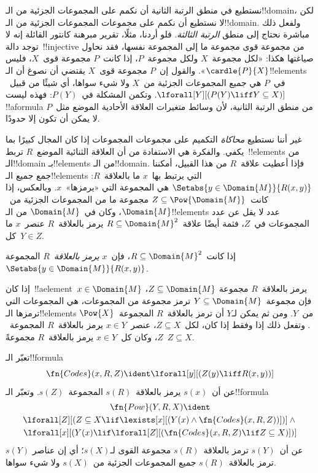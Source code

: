\documentclass[../../../include/open-logic-section]{subfiles}
\begin{document}


\begin{explain}
نستطيع في منطق الرتبة الثانية أن نكمم على المجموعات الجزئية من
الـ!!{domain}، لكن لا نستطيع أن نكمم على مجموعات المجموعات الجزئية من
الـ!!{domain}.
ولفعل ذلك مباشرة نحتاج إلى منطق \emph{الرتبة الثالثة}. فلو أردنا، مثلًا،
تقرير مبرهنة كانتور القائلة إنه لا توجد دالة~!!{injective} من مجموعة
قوى مجموعة ما إلى المجموعة نفسها، فقد نحاول صياغتها هكذا: «لكل
مجموعة~$X$ ولكل مجموعة~$P$، إذا كانت~$P$ مجموعة قوى~$X$، فليس
$\cardle{P}{X}$». والقول إن~$P$ مجموعة قوى~$X$ يقتضي أن نصوغ أن
الـ!!{element}s في~$P$ هي جميع المجموعات الجزئية من~$X$ ولا شيء
سواها، أي شيئًا من قبيل~$\lforall[Y][(P(Y)
  \liff Y \subseteq X)]$. وتكمن المشكلة في~$P(Y)$: فهذه ليست
!!a{formula} من منطق الرتبة الثانية، لأن وسائط متغيرات العلاقة الأحادية
الموضع مثل~$P$ لا يمكن أن تكون إلا حدودًا.

غير أننا نستطيع \emph{محاكاة} التكميم على مجموعات المجموعات إذا كان
المجال كبيرًا بما يكفي. والفكرة هي الاستفادة من أن العلاقة الثنائية
الموضع~$R$ تربط~!!{element}s من الـ!!{domain} بـ!!{element}s من
الـ!!{domain}. فإذا أعطيت علاقة~$R$ من هذا القبيل، أمكننا جمع جميع
الـ!!{element}s التي يرتبط بها~$x$ ما بالعلاقة~$R$:
$\Setabs{y \in \Domain{M}}{R(x,y)}$ هي المجموعة التي «يرمزها»~$x$.
وبالعكس، إذا كانت~$Z \subseteq \Pow{\Domain{M}}$ مجموعة ما من
المجموعات الجزئية من~$\Domain{M}$، وكان في~$\Domain{M}$ من
الـ!!{element}s عدد لا يقل عن عدد المجموعات في~$Z$، فثمة أيضًا
علاقة~$R \subseteq \Domain{M}^2$ يرمز بالعلاقة~$R$ عنصر~$x$ ما
كل~$Y \in Z$.
\end{explain}

\begin{defn}
إذا كانت~$R \subseteq \Domain{M}^2$، فإن~\emph{$x$ يرمز بالعلاقة~$R$}
المجموعة~$\Setabs{y \in \Domain{M}}{R(x, y)}$.
\end{defn}

إذا كان~!!a{element}~$x \in \Domain{M}$ يرمز بالعلاقة~$R$ مجموعة
$Z \subseteq \Domain{M}$، فإن مجموعة~$Y \subseteq \Domain{M}$ ترمز
مجموعة من المجموعات، هي المجموعات التي ترمزها الـ!!{element}s من~$Y$.
ومن ثم يمكن لـ$Y$ أن ترمز بالعلاقة~$R$ المجموعة~$\Pow{X}$. وتفعل ذلك
إذا وفقط إذا كان، لكل~$Z \subseteq X$، عنصر~$x \in Y$ يرمز
بالعلاقة~$R$ المجموعة~$Z$، وكان كل~$x \in Y$ يرمز بالعلاقة~$R$
مجموعةً~$Z \subseteq X$.

\begin{prop}
تعبّر الـ!!{formula}
  \[
  \fn{Codes}(x, R, Z) \ident \lforall[y][(Z(y) \liff
    R(x, y))]
  \]
عن أن~$s(x)$ يرمز بالعلاقة~$s(R)$ المجموعة~$s(Z)$. وتعبّر
الـ!!{formula}
\begin{multline*}
  \fn{Pow}(Y, R, X) \ident \\
  \lforall[Z][(Z \subseteq X \lif \lexists[x][(Y(x) \land
    \fn{Codes}(x, R, Z))])] \land {} \\ \lforall[x][(Y(x) \lif
  \lforall[Z][(\fn{Codes}(x, R, Z) \lif Z \subseteq X)])]
\end{multline*}
عن أن~$s(Y)$ ترمز بالعلاقة~$s(R)$ مجموعة القوى لـ$s(X)$؛ أي إن عناصر
$s(Y)$ ترمز بالعلاقة~$s(R)$ جميع المجموعات الجزئية من~$s(X)$ ولا شيء
سواها.
\end{prop}
\end{document}
